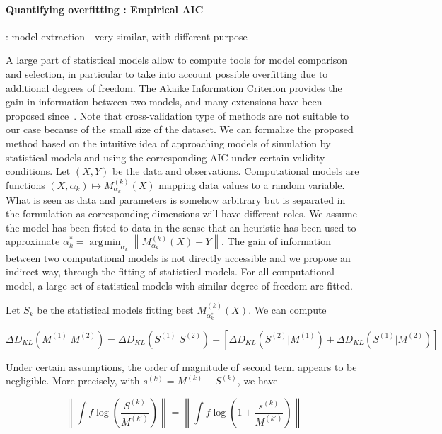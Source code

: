 \documentclass[Royal,sageh,times]{sagej}
\newcommand{\norm}[1]{\left\lVert #1 \right\rVert}
\DeclareMathOperator*{\argmin}{\arg\!\min}
\begin{document}
\paragraph{Quantifying overfitting : Empirical AIC}



\cite{2017arXiv170609773B} : model extraction - very similar, with different purpose

A large part of statistical models allow to compute tools for model comparison and selection, in particular to take into account possible overfitting due to additional degrees of freedom. The Akaike Information Criterion provides the gain in information between two models, and many extensions have been proposed since~\cite{}.%
Note that cross-validation type of methods are not suitable to our case because of the small size of the dataset. We can formalize the proposed method based on the intuitive idea of approaching models of simulation by statistical models and using the corresponding AIC under certain validity conditions. Let $(X,Y)$ be the data and observations. Computational models are functions $(X,\alpha_k) \mapsto M_{\alpha_k}^{(k)}(X)$ mapping data values to a random variable. What is seen as data and parameters is somehow arbitrary but is separated in the formulation as corresponding dimensions will have different roles. We assume the model has been fitted to data in the sense that an heuristic has been used to approximate $\alpha^{\ast}_k = \argmin_{\alpha_k}\norm{M_{\alpha_k}^{(k)}(X) - Y}$. The gain of information between two computational models is not directly accessible and we propose an indirect way, through the fitting of statistical models. For all computational model, a large set of statistical models with similar degree of freedom are fitted.

Let $S_k$ be the statistical models fitting best $M^{(k)}_{\alpha^{\ast}_k}(X)$. We can compute

\[
\Delta D_{KL} \left(M^{(1)}|M^{(2)}\right) = \Delta D_{KL} \left(S^{(1)}|S^{(2)}\right) + \left[ \Delta D_{KL} \left(S^{(2)}|M^{(1)}\right) + \Delta D_{KL} \left(S^{(1)}|M^{(2)}\right) \right]
\]

Under certain assumptions, the order of magnitude of second term appears to be negligible. More precisely, with $s^{(k)}=M^{(k)}-S^{(k)}$, we have

\[
\norm{\int f \log{\left(\frac{S^{(k)}}{M^{(k')}}\right)}} = \norm{\int f \log{\left(1 + \frac{s^{(k)}}{M^{(k')}}\right)}}
\]
\end{document}
